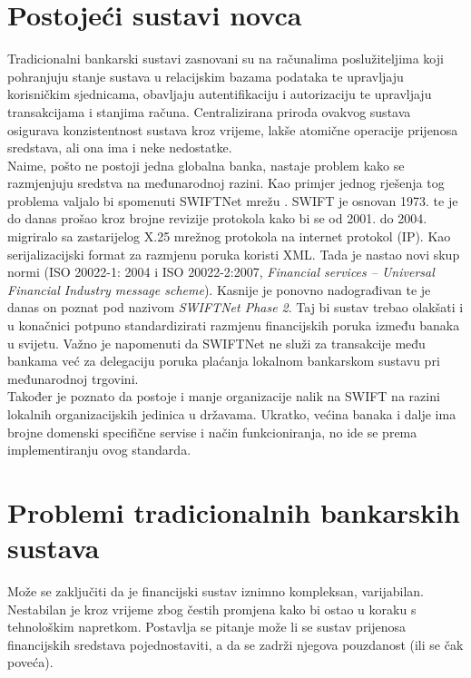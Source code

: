 \documentclass[utf8, zavrsni]{fer}
\begin{document}
\section{Postojeći sustavi novca}
Tradicionalni bankarski sustavi zasnovani su na računalima poslužiteljima koji pohranjuju stanje sustava u relacijskim bazama podataka te upravljaju korisničkim sjednicama, obavljaju autentifikaciju i autorizaciju te upravljaju transakcijama i stanjima računa. Centralizirana priroda ovakvog sustava osigurava konzistentnost sustava kroz vrijeme, lakše atomične operacije prijenosa sredstava, ali ona ima i neke nedostatke. \\
Naime, pošto ne postoji jedna globalna banka, nastaje problem kako se razmjenjuju sredstva na međunarodnoj razini. Kao primjer jednog rješenja tog problema valjalo bi spomenuti SWIFTNet mrežu \cite{enwiki:1021608159}. SWIFT je osnovan 1973. te je do danas prošao kroz brojne revizije protokola kako bi se od 2001. do 2004. migriralo sa zastarijelog X.25 mrežnog protokola na internet protokol (IP). Kao serijalizacijski format za razmjenu poruka koristi XML. Tada je nastao novi skup normi (ISO 20022-1: 2004 i ISO 20022-2:2007, \textit{Financial services – Universal Financial Industry message scheme}). Kasnije je ponovno nadograđivan te je danas on poznat pod nazivom \textit{SWIFTNet Phase 2}. Taj bi sustav trebao olakšati i u konačnici potpuno standardizirati razmjenu financijskih poruka između banaka u svijetu. Važno je napomenuti da SWIFTNet ne služi za transakcije među bankama već za delegaciju poruka plaćanja lokalnom bankarskom sustavu pri međunarodnoj trgovini. \\ 

Također je poznato da postoje i manje organizacije nalik na SWIFT na razini lokalnih organizacijskih jedinica u državama. Ukratko, većina banaka i dalje ima brojne domenski specifične servise i način funkcioniranja, no ide se prema implementiranju ovog standarda.

\section{Problemi tradicionalnih bankarskih sustava}
	
Može se zaključiti da je financijski sustav iznimno kompleksan, varijabilan. Nestabilan je kroz vrijeme zbog čestih promjena kako bi ostao u koraku s tehnološkim napretkom. Postavlja se pitanje može li se sustav prijenosa financijskih sredstava pojednostaviti, a da se zadrži njegova pouzdanost (ili se čak poveća). \\
\end{document}
